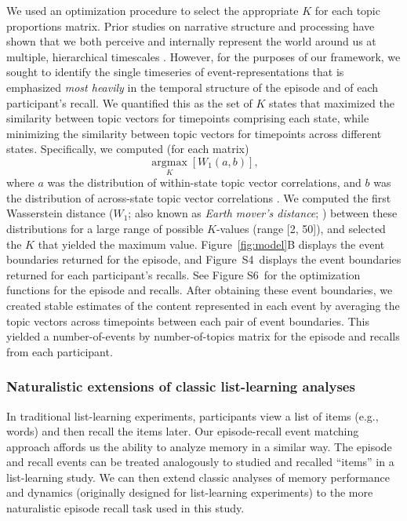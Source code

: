 \documentclass[10pt]{article}
\newcommand{\argmax}{\mathop{\mathrm{argmax}}\limits}
\newcommand{\corrmats}{S4}
\newcommand{\kopt}{S6}
\begin{document}
We used an optimization procedure to select the appropriate $K$ for each topic proportions matrix.  Prior studies on narrative structure and processing have shown that we both perceive and internally represent the world around us at multiple, hierarchical timescales \citep[e.g.,][]{HassEtal08, LernEtal11, HassEtal15, ChenEtal17, BaldEtal17, BaldEtal18}.  However, for the purposes of our framework, we sought to identify the single timeseries of event-representations that is emphasized \textit{most heavily} in the temporal structure of the episode and of each participant's recall.  We quantified this as the set of $K$ states that maximized the similarity between topic vectors for timepoints comprising each state, while minimizing the similarity between topic vectors for timepoints across different states.  Specifically, we computed (for each matrix)
\[
  \argmax_K \left[W_{1}(a, b)\right],
\]
where $a$ was the distribution of within-state topic vector correlations, and $b$ was the distribution of across-state topic vector correlations .  We computed the first Wasserstein distance ($W_{1}$; also known as \textit{Earth mover's distance}; \citealp{Dobr70, RamdEtal17}) between these distributions for a large range of possible $K$-values (range [2, 50]), and selected the $K$ that yielded the maximum value.  Figure~\ref{fig:model}B displays the event boundaries returned for the episode, and Figure~\corrmats~displays the event boundaries returned for each participant's recalls.  See Figure \kopt~for the optimization functions for the episode and recalls.  After obtaining these event boundaries, we created stable estimates of the content represented in each event by averaging the topic vectors across timepoints between each pair of event boundaries.  This yielded a number-of-events by number-of-topics matrix for the episode and recalls from each participant.

\subsubsection*{Naturalistic extensions of classic list-learning analyses}
In traditional list-learning experiments, participants view a list of items (e.g., words) and then recall the items later.  Our episode-recall event matching approach affords us the ability to analyze memory in a similar way. The episode and recall events can be treated analogously to studied and recalled ``items'' in a list-learning study.  We can then extend classic analyses of memory performance and dynamics (originally designed for list-learning experiments) to the more naturalistic episode recall task used in this study.
\end{document}
